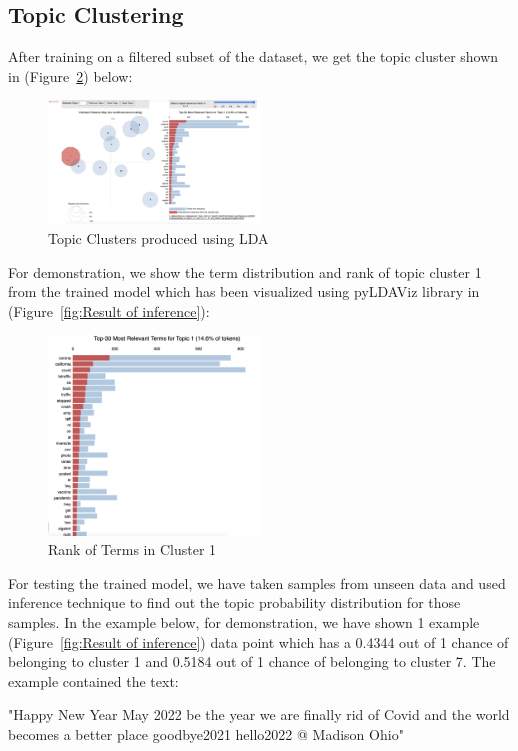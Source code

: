 \subsection{Topic Clustering}
After training on a filtered subset of the dataset, we get the topic cluster
shown in (Figure~\ref{fig:Rank of Terms}) below: 
\begin{figure}[H]
    \centering
    \includegraphics[width=0.5\textwidth]{imgs/cluster_topics.png}
    \caption{\label{fig:Topic Clusters}Topic Clusters produced using LDA}
    \label{fig:lda_topic}
\end{figure}
For demonstration, we show the term distribution and rank of topic cluster 1
from the trained model which has been visualized using pyLDAViz library in
(Figure~\ref{fig:Result of inference}):
\begin{figure}[H]
    \centering
    \includegraphics[width=0.5\textwidth]{imgs/term_ranks.png}
    \caption{\label{fig:Rank of Terms}Rank of Terms in Cluster 1}
\end{figure}
For testing the trained model, we have taken samples from unseen data and used
inference technique to find out the topic probability distribution for those
samples. In the example below, for demonstration, we have shown 1 example
(Figure~\ref{fig:Result of inference}) data point which has a 0.4344 out of 1
chance of belonging to cluster 1 and 0.5184 out of 1 chance of belonging to
cluster 7. The example contained the text: 
\begin{displayquote}
"Happy New Year May 2022 be the year we are finally rid of Covid and the world
 becomes a better place goodbye2021 hello2022 @ Madison Ohio"
\end{displayquote}

